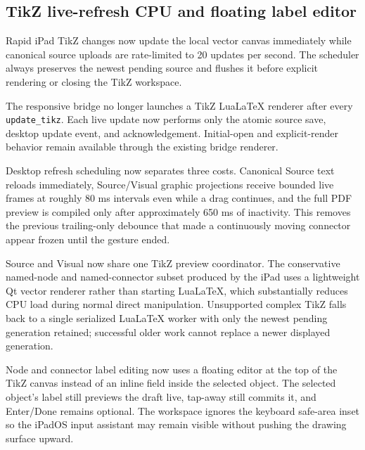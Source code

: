 \documentclass[a4paper]{article}
\title{}
\date{}
\author{Mohammad Rahmani}
\begin{document}
   \maketitle

   \begin{preview}
      \section*{TikZ live-refresh CPU and floating label editor}

Rapid iPad TikZ changes now update the local vector canvas immediately while canonical source uploads are rate-limited to 20 updates per second. The scheduler always preserves the newest pending source and flushes it before explicit rendering or closing the TikZ workspace.

The responsive bridge no longer launches a TikZ LuaLaTeX renderer after every \texttt{update\_tikz}. Each live update now performs only the atomic source save, desktop update event, and acknowledgement. Initial-open and explicit-render behavior remain available through the existing bridge renderer.

Desktop refresh scheduling now separates three costs. Canonical Source text reloads immediately, Source/Visual graphic projections receive bounded live frames at roughly 80 ms intervals even while a drag continues, and the full PDF preview is compiled only after approximately 650 ms of inactivity. This removes the previous trailing-only debounce that made a continuously moving connector appear frozen until the gesture ended.

Source and Visual now share one TikZ preview coordinator. The conservative named-node and named-connector subset produced by the iPad uses a lightweight Qt vector renderer rather than starting LuaLaTeX, which substantially reduces CPU load during normal direct manipulation. Unsupported complex TikZ falls back to a single serialized LuaLaTeX worker with only the newest pending generation retained; successful older work cannot replace a newer displayed generation.

Node and connector label editing now uses a floating editor at the top of the TikZ canvas instead of an inline field inside the selected object. The selected object's label still previews the draft live, tap-away still commits it, and Enter/Done remains optional. The workspace ignores the keyboard safe-area inset so the iPadOS input assistant may remain visible without pushing the drawing surface upward.

   \end{preview}

   
   
\end{document}
